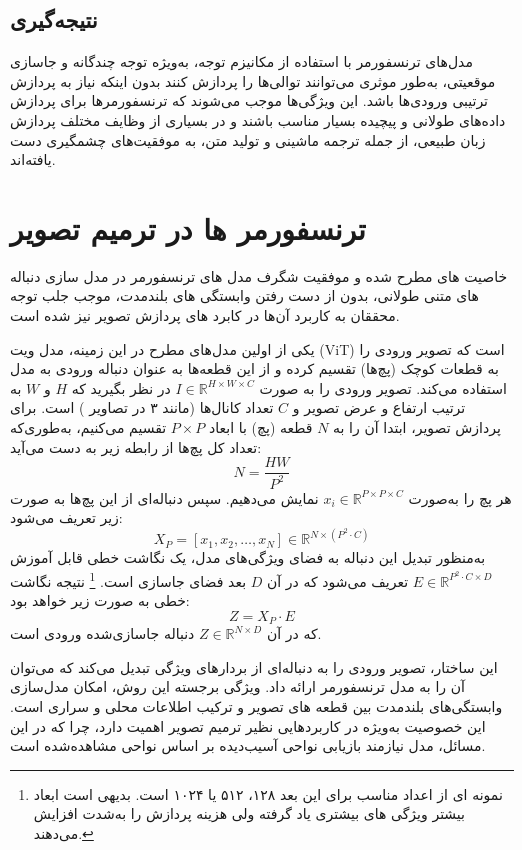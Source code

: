 \subsection*{نتیجه‌گیری}
مدل‌های ترنسفورمر با استفاده از مکانیزم توجه، به‌ویژه توجه چندگانه و جاسازی موقعیتی، به‌طور موثری می‌توانند توالی‌ها را پردازش کنند بدون اینکه نیاز به پردازش ترتیبی ورودی‌ها باشد. این ویژگی‌ها موجب می‌شوند که ترنسفورمرها برای پردازش داده‌های طولانی و پیچیده بسیار مناسب باشند و در بسیاری از وظایف مختلف پردازش زبان طبیعی، از جمله ترجمه ماشینی و تولید متن، به موفقیت‌های چشمگیری دست یافته‌اند.


\section{ترنسفورمر ها در ترمیم تصویر}

خاصیت های مطرح شده و موفقیت شگرف مدل های ترنسفورمر
\cite{radfordLanguageModelsAre2019}
\cite{brownLanguageModelsAre2020}
\cite{openaiGPT4TechnicalReport2024}
در مدل سازی دنباله های متنی طولانی، بدون از دست رفتن وابستگی های بلندمدت، موجب جلب توجه محققان به کاربرد آن‌ها در کابرد های پردازش تصویر نیز شده است.
\cite{liuSwinTransformerHierarchical2021}


یکی از اولین مدل‌های مطرح در این زمینه، مدل ویت (ViT) 
\cite{dosovitskiyImageWorth16x162021}
است که تصویر ورودی را به قطعات کوچک (پچ‌ها) تقسیم کرده و از این قطعه‌ها به عنوان دنباله ورودی به مدل استفاده می‌کند. تصویر ورودی را به صورت $I \in \mathbb{R}^{H \times W \times C}$ در نظر بگیرید که $H$ و $W$ به ترتیب ارتفاع و عرض تصویر و $C$ تعداد کانال‌ها (مانند ۳ در تصاویر ) است. برای پردازش تصویر، ابتدا آن را به $N$ قطعه (پچ) با ابعاد $P \times P$ تقسیم می‌کنیم، به‌طوری‌که تعداد کل پچ‌ها از رابطه زیر به دست می‌آید:
\[
N = \frac{HW}{P^2}
\]
هر پچ را به‌صورت $x_i \in \mathbb{R}^{P \times P \times C}$ نمایش می‌دهیم. سپس دنباله‌ای از این پچ‌ها به صورت زیر تعریف می‌شود:
\[
X_P = [x_1, x_2, \dots, x_N] \in \mathbb{R}^{N \times (P^2 \cdot C)}
\]
به‌منظور تبدیل این دنباله به فضای ویژگی‌های مدل، یک نگاشت خطی قابل آموزش $E \in \mathbb{R}^{P^2 \cdot C \times D}$ تعریف می‌شود که در آن $D$ بعد فضای جاسازی است.
\footnote{نمونه ای از اعداد مناسب برای این بعد ۱۲۸، ۵۱۲ یا ۱۰۲۴ است. بدیهی است ابعاد بیشتر ویژگی های بیشتری یاد گرفته ولی هزینه پردازش را به‌شدت افزایش می‌دهند.}
 نتیجه نگاشت خطی به صورت زیر خواهد بود:
\[
Z = X_P \cdot E
\]
که در آن $Z \in \mathbb{R}^{N \times D}$ دنباله جاسازی‌شده ورودی است. 

این ساختار، تصویر ورودی را به دنباله‌ای از بردارهای ویژگی تبدیل می‌کند که می‌توان آن را به مدل ترنسفورمر ارائه داد. ویژگی برجسته این روش، امکان مدل‌سازی وابستگی‌های بلندمدت بین قطعه های تصویر و ترکیب اطلاعات محلی و سراری است. این خصوصیت به‌ویژه در کاربردهایی نظیر ترمیم تصویر اهمیت دارد، چرا که در این مسائل، مدل نیازمند بازیابی نواحی آسیب‌دیده بر اساس نواحی مشاهده‌شده است.

